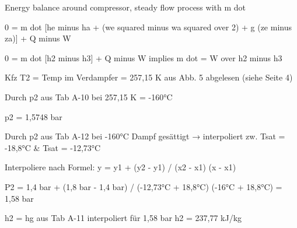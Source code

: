 Energy balance around compressor, steady flow process with m dot

0 = m dot [he minus ha + (we squared minus wa squared over 2) + g (ze minus za)] + Q minus W

0 = m dot [h2 minus h3] + Q minus W implies m dot = W over h2 minus h3

Kfz T2 = Temp im Verdampfer = 257,15 K aus Abb. 5 abgelesen (siehe Seite 4)

Durch p2 aus Tab A-10 bei 257,15 K = -160°C

p2 = 1,5748 bar

Durch p2 aus Tab A-12 bei -160°C
Dampf gesättigt → interpoliert zw.
Tsat = -18,8°C & Tsat = -12,73°C

Interpoliere nach Formel:
y = y1 + (y2 - y1) / (x2 - x1) (x - x1)

P2 = 1,4 bar + (1,8 bar - 1,4 bar) / (-12,73°C + 18,8°C) (-16°C + 18,8°C) = 1,58 bar

h2 = hg aus Tab A-11 interpoliert für 1,58 bar
h2 = 237,77 kJ/kg